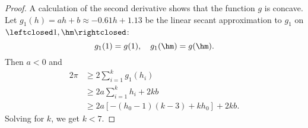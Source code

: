 \begin{proof}
A calculation of the second derivative shows that the function $g$ is concave.
Let $g_1(h) = a h + b\approx -0.61 h + 1.13$ 
be the linear secant approximation to $g_1$ on 
$\leftclosed 1,\hm\rightclosed$:
\[
g_1(1) = g(1),\quad g_1(\hm) = g(\hm).
\]
Then $a<0$ and
\begin{align*}
2\pi &\ge 2\sum_{i=1}^k g_1(h_i) \\
   &\ge 2 a \sum_{i=1}^k h_i + 2 k b\\
   &\ge 2 a \left[ -(h_0-1) (k-3) + k h_0  \right] + 2 k b.
\end{align*}
Solving for $k$, we get $k < 7$.
%
\end{proof}


%
%





